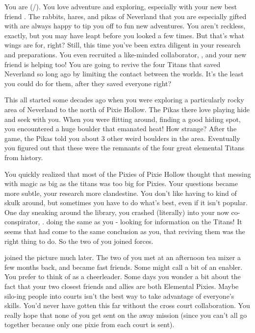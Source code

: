 \documentclass[char]{PP}
\begin{document}
\name{\cFTitan{}}

You are \cFTitan{} (\cFTitan{\They}/\cFTitan{\Them}). You love adventure and exploring, especially with your new best friend \cEAirship{}. The rabbits, hares, and pikas of Neverland that you are especially gifted with are always happy to tip you off to fun new adventures. You aren’t reckless, exactly, but you may have leapt before you looked a few times. But that’s what wings are for, right? Still, this time you've been extra diligent in your research and preparations. You even recruited a like-minded collaborator, \cETitan{}, and your new friend \cEAirship{} is helping too! You are going to revive the four Titans that saved Neverland so long ago by limiting the contact between the worlds. It’s the least you could do for them, after they saved everyone right? 

This all started some decades ago when you were exploring a particularly rocky area of Neverland to the north of Pixie Hollow. The Pikas there love playing hide and seek with you. When you were flitting around, finding a good hiding spot, you encountered a huge boulder that emanated heat! How strange? After the game, the Pikas told you about 3 other weird boulders in the area. Eventually you figured out that these were the remnants of the four great elemental Titans from history.

You quickly realized that most of the Pixies of Pixie Hollow thought that messing with magic as big as the titans was too big for Pixies. Your questions became more subtle, your research more clandestine. You don’t like having to kind of skulk around, but sometimes you have to do what’s best, even if it isn’t popular. One day sneaking around the library, you crashed (literally) into your now co-conspirator, \cETitan{}. \cETitan{\They} \cETitan{\were} doing the same as you - looking for information on the Titans! It seems that \cETitan{\they} had come to the same conclusion as you, that reviving them was the right thing to do. So the two of you joined forces.

\cEAirship{} joined the picture much later. The two of you met at an afternoon tea mixer a few months back, and became fast friends. Some might call \cEAirship{} a bit of an enabler. You prefer to think of \cEAirship{\them} as a cheerleader. Some days you wonder a bit about the fact that your two closest friends and allies are both Elemental Pixies. Maybe silo-ing people into courts isn’t the best way to take advantage of everyone’s skills. You’d never have gotten this far without the cross court collaboration. You really hope that none of you get sent on the away mission (since you can’t all go together because only one pixie from each court is sent).
\end{document}
